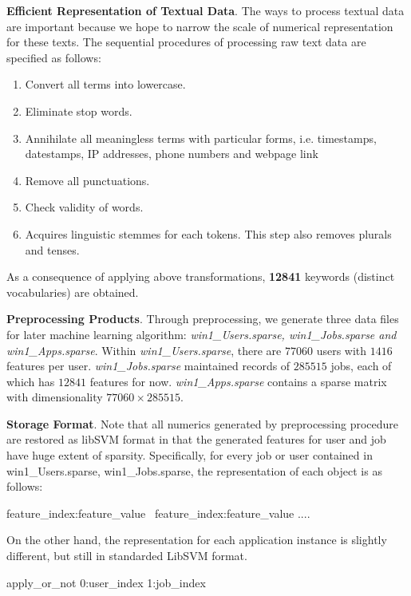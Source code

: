 \documentclass{article} %
\begin{document}
{\bf Efficient Representation of Textual Data}.
The ways to process textual data are important because we hope to narrow the
scale of numerical representation for these texts.  The sequential procedures
of processing raw text data are specified as follows:
\begin{enumerate}[label=(\roman*)]
  \item{Convert all terms into lowercase.}
  \item{Eliminate stop words.}
  \item{Annihilate all meaningless terms with particular forms, i.e.
          timestamps, datestamps, IP addresses, phone numbers and webpage link}
  \item{Remove all punctuations.}
  \item{Check validity of words.}
  \item{Acquires linguistic stemmes for each tokens. This step also removes
          plurals and tenses.}
\end{enumerate}
As a consequence of applying above transformations, {\bf 12841}
keywords (distinct vocabularies) are obtained. 

{\bf Preprocessing Products}.
Through preprocessing, we generate three data files for later machine learning
algorithm: {\it win1\_Users.sparse, win1\_Jobs.sparse and win1\_Apps.sparse}.
Within {\it win1\_Users.sparse}, there are $77060$ users with $1416$ features per
user. {\it win1\_Jobs.sparse} maintained records of $285515$ jobs, each of
which has $12841$ features for now. {\it win1\_Apps.sparse} contains a sparse
matrix with dimensionality $77060\times285515$.

{\bf Storage Format}. Note that all numerics generated by preprocessing
procedure are restored as libSVM format in that the generated features for
user and job have huge extent of sparsity. 
Specifically, for every job or user contained in win1\_Users.sparse,
win1\_Jobs.sparse, the representation of each object is as follows:
\begin{center}
    feature\_index:feature\_value \ feature\_index:feature\_value .... 
\end{center}
On the other hand, the representation for each application instance is slightly different,
but still in standarded LibSVM format. 
\begin{center}
    apply\_or\_not 0:user\_index 1:job\_index
\end{center}
\end{document}

